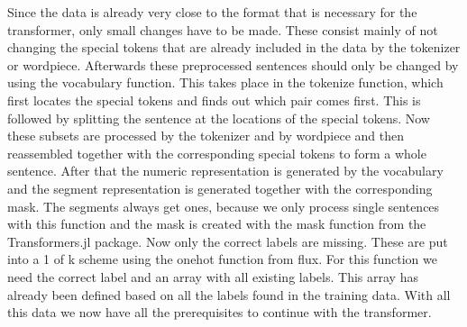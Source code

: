 Since the data is already very close to the format that is necessary for the transformer, only small changes have to be made. These consist mainly of not changing the special tokens that are already included in the data by the tokenizer or wordpiece. Afterwards these preprocessed sentences should only be changed by using the vocabulary function. This takes place in the tokenize function, which first locates the special tokens and finds out which pair comes first. This is followed by splitting the sentence at the locations of the special tokens. Now these subsets are processed by the tokenizer and by wordpiece and then reassembled together with the corresponding special tokens to form a whole sentence. After that the numeric representation is generated by the vocabulary and the segment representation is generated together with the corresponding mask. The segments always get ones, because we only process single sentences with this function and the mask is created with the mask function from the Transformers.jl package. Now only the correct labels are missing. These are put into a 1 of k scheme using the onehot function from flux. For this function we need the correct label and an array with all existing labels. This array has already been defined based on all the labels found in the training data. With all this data we now have all the prerequisites to continue with the transformer. 

\color{black}

